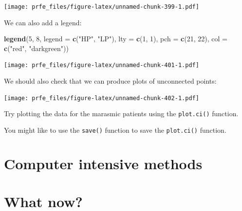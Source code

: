\documentclass[12pt,]{book}
\newenvironment{Shaded}{\begin{snugshade}}{\end{snugshade}}
\newcommand{\KeywordTok}[1]{\textcolor[rgb]{0.13,0.29,0.53}{\textbf{#1}}}
\newcommand{\DataTypeTok}[1]{\textcolor[rgb]{0.13,0.29,0.53}{#1}}
\newcommand{\DecValTok}[1]{\textcolor[rgb]{0.00,0.00,0.81}{#1}}
\newcommand{\StringTok}[1]{\textcolor[rgb]{0.31,0.60,0.02}{#1}}
\newcommand{\OperatorTok}[1]{\textcolor[rgb]{0.81,0.36,0.00}{\textbf{#1}}}
\newcommand{\NormalTok}[1]{#1}
\theoremstyle{definition}
\theoremstyle{definition}
\theoremstyle{definition}
\theoremstyle{remark}
\begin{document}
\texttt{[image: prfe\_files/figure-latex/unnamed-chunk-399-1.pdf]}

We can also add a legend:

\begin{Shaded}
\begin{Highlighting}[]
\KeywordTok{legend}\NormalTok{(}\DecValTok{5}\NormalTok{, }\DecValTok{8}\NormalTok{, }\DataTypeTok{legend =} \KeywordTok{c}\NormalTok{(}\StringTok{"HP"}\NormalTok{, }\StringTok{"LP"}\NormalTok{), }\DataTypeTok{lty =} \KeywordTok{c}\NormalTok{(}\DecValTok{1}\NormalTok{, }\DecValTok{1}\NormalTok{),}
       \DataTypeTok{pch =} \KeywordTok{c}\NormalTok{(}\DecValTok{21}\NormalTok{, }\DecValTok{22}\NormalTok{), }\DataTypeTok{col =} \KeywordTok{c}\NormalTok{(}\StringTok{"red"}\NormalTok{, }\StringTok{"darkgreen"}\NormalTok{))}
\end{Highlighting}
\end{Shaded}

\texttt{[image: prfe\_files/figure-latex/unnamed-chunk-401-1.pdf]}

We should also check that we can produce plots of unconnected points:

\begin{Shaded}
\end{Shaded}

\texttt{[image: prfe\_files/figure-latex/unnamed-chunk-402-1.pdf]}

Try plotting the data for the marasmic patients using the
\texttt{plot.ci()} function.

You might like to use the \texttt{save()} function to save the
\texttt{plot.ci()} function.

\hypertarget{exercise9}{%
\chapter{Computer intensive methods}\label{exercise9}}

\hypertarget{whatnow}{%
\chapter{What now?}\label{whatnow}}


\end{document}

